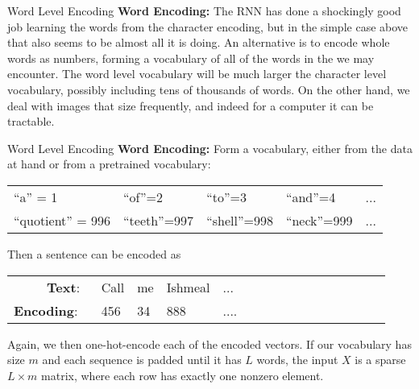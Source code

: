 \documentclass[10pt, table, dvipsnames,xcdraw, handout]{beamer}
\begin{document}
\begin{frame}[fragile]{Word Level Encoding}
\textbf{Word Encoding:} The RNN has done a shockingly good job learning the words from the character encoding, but in the simple case above that also seems to be almost all it is doing. An alternative is to encode whole words as numbers, forming a vocabulary of all of the words in the we may encounter. The word level vocabulary will be much larger the character level vocabulary, possibly including tens of thousands of words. On the other hand, we deal with images that size frequently, and indeed for a computer it can be tractable. 

\end{frame}



\begin{frame}[fragile]{Word Level Encoding}
\textbf{Word Encoding:} Form a vocabulary, either from the data at hand or from a pretrained vocabulary:
\begin{center}
\begin{tabular}{lllll}
``a'' = 1& ``of''=2 & ``to''=3 & ``and''=4 &...
\\
``quotient'' = 996& ``teeth''=997 & ``shell''=998 & ``neck''=999&...
\end{tabular}
\end{center}
Then a sentence can be encoded as
\begin{center}
\begin{tabular}{rlllllllllllllll}
\textbf{Text}:\,\,\,\,&Call&me&Ishmeal& ...
\\
\textbf{Encoding}: \,\,\,& 456&34&888&....
\end{tabular}
\end{center}

Again, we then one-hot-encode each of the encoded vectors. If our vocabulary has size $m$ and each sequence is padded until it has $L$ words, the input $X$ is a sparse $L\times m$ matrix, where each row has exactly one nonzero element. 
\end{frame}
\end{document}
